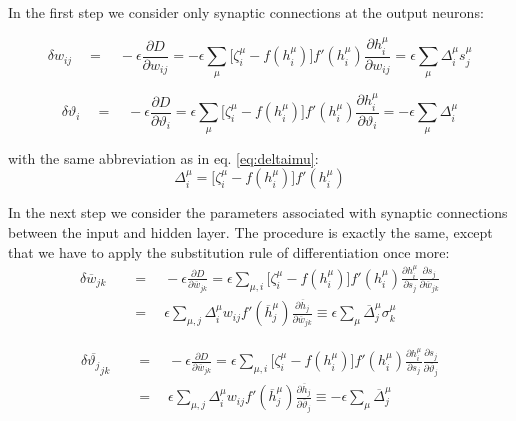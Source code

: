 In the first step we consider only synaptic connections at the output neurons:


\begin{equation}
\delta w_{ij}\quad=\quad-\epsilon\frac{\partial D}{\partial w_{ij}}=-\epsilon\sum_{\mu}\Big[\zeta^{\mu}_{i}-f(h_{i}^{\mu})\Big]f'(h^{\mu}_{i}) \frac{\partial h^{\mu}_{i}}{\partial w_{ij}}=
\epsilon \sum_{\mu}\Delta^{\mu}_{i}s^{\mu}_{j}
\label{eq:deltaw}
\end{equation}

\begin{equation}
\delta \vartheta_{i}\quad=\quad-\epsilon\frac{\partial D}{\partial \vartheta_{i}}=\epsilon\sum_{\mu}\Big[\zeta^{\mu}_{i}-f(h_{i}^{\mu})\Big]f'(h^{\mu}_{i}) \frac{\partial h^{\mu}_{i}}{\partial \vartheta_{i}}=-\epsilon \sum_{\mu}\Delta^{\mu}_{i}
\label{eq:deltatheta}
\end{equation}

with the same abbreviation as in eq. \ref{eq:deltaimu}:
\begin{equation}
\Delta^{\mu}_{i}=\Big[\zeta^{\mu}_{i}-f(h_{i}^{\mu})\Big]f'(h^{\mu}_{i})
\end{equation}

In the next step we consider the parameters associated with synaptic connections between the input and hidden layer. The procedure is exactly the same, except that we have to apply the substitution rule of differentiation once more:
\begin{equation}
\begin{split}
\delta \overline{w}_{jk}\quad&=\quad-\epsilon\frac{\partial D}{\partial \overline{w}_{jk}}=\epsilon\sum_{\mu,i}\Big[\zeta^{\mu}_{i}-f(h_{i}^{\mu})\Big]f'(h^{\mu}_{i}) \frac{\partial h^{\mu}_{i}}{\partial s_{j}}\frac{\partial s_{j}}{\partial \overline{w}_{jk}}\\
&=\quad \epsilon \sum_{\mu,j} \Delta_{i}^{\mu}w_{ij}f'(\overline{h}_{j}^{\mu})\frac{\partial \overline{h}_{j}}{\partial \overline{w}_{jk}} \equiv \epsilon \sum_{\mu}\overline{\Delta}_{j}^{\mu}\sigma_{k}^{\mu}
\end{split}
\label{eq:deltabarw}
\end{equation}

\begin{equation}
\begin{split}
\delta \overline{\vartheta_{j}}_{jk}\quad&=\quad-\epsilon\frac{\partial D}{\partial \overline{w}_{jk}}=\epsilon\sum_{\mu,i}\Big[\zeta^{\mu}_{i}-f(h_{i}^{\mu})\Big]f'(h^{\mu}_{i}) \frac{\partial h^{\mu}_{i}}{\partial s_{j}}\frac{\partial s_{j}}{\partial \overline{\vartheta}_{j}}\\
&=\quad \epsilon \sum_{\mu,j} \Delta_{i}^{\mu}w_{ij}f'(\overline{h}_{j}^{\mu})\frac{\partial \overline{h}_{j}}{\partial \overline{\vartheta}_{j}} \equiv -\epsilon \sum_{\mu}\overline{\Delta}_{j}^{\mu}
\label{eq:deltabartheta}
\end{split}
\end{equation}

